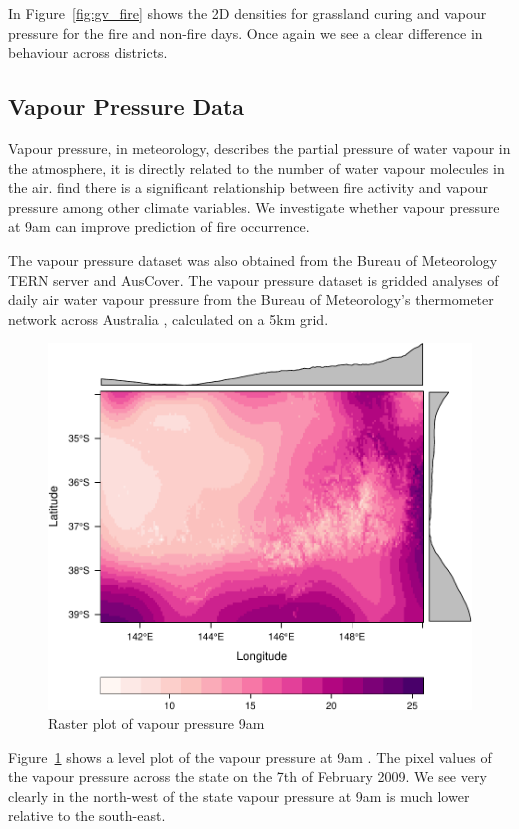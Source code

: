 \documentclass[11pt,a4paper]{article}
\begin{document}
In Figure~\ref{fig:gv_fire} shows the 2D densities for grassland curing and vapour pressure for the fire and non-fire days. Once again we see a clear difference in behaviour across districts.

\subsection{Vapour Pressure  Data}

Vapour pressure, in meteorology, describes the partial pressure of water vapour in the atmosphere, it is directly related to the number of water vapour molecules in the air.  \citet{harris14} find there is a significant relationship between fire activity and vapour pressure among other climate variables. We investigate whether vapour pressure at 9am can improve prediction of fire occurrence.

The vapour pressure dataset was also obtained from the Bureau of Meteorology TERN server and AusCover. The vapour pressure dataset is gridded analyses of daily air water vapour pressure from the Bureau of Meteorology's thermometer network across Australia \citep{jones09}, calculated on a 5km grid.

\begin{figure}
  \centering
	\includegraphics[width=.8\textwidth]{figures/vap_ras.pdf}
  \caption{Raster plot of vapour pressure 9am }
  \label{fig:vap_ras}
\end{figure}

Figure~\ref{fig:vap_ras} shows a level plot of the vapour pressure at 9am \citep{rastervis}. The pixel values of the vapour pressure across the state on the 7th of February 2009. We see very clearly in the north-west of the state vapour pressure at 9am is much lower relative to the south-east.
\end{document}
